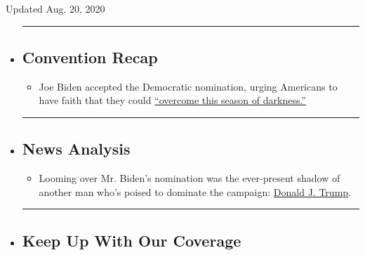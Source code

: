 Updated Aug. 20, 2020

\begin{itemize}
\item
  \begin{center}\rule{0.5\linewidth}{\linethickness}\end{center}

  \hypertarget{convention-recap}{%
  \subsection{Convention Recap}\label{convention-recap}}

  \begin{itemize}
  \tightlist
  \item
    Joe Biden accepted the Democratic nomination, urging Americans to
    have faith that they could
    \href{https://www.nytimes3xbfgragh.onion/2020/08/20/us/politics/Joe-Biden-accepts-democratic-nomination.html?action=click\&pgtype=Article\&state=default\&region=BELOW_MAIN_CONTENT\&context=storylines_guide}{``overcome
    this season of darkness.''}
  \end{itemize}
\item
  \begin{center}\rule{0.5\linewidth}{\linethickness}\end{center}

  \hypertarget{news-analysis}{%
  \subsection{News Analysis}\label{news-analysis}}

  \begin{itemize}
  \tightlist
  \item
    Looming over Mr. Biden's nomination was the ever-present shadow of
    another man who's poised to dominate the campaign:
    \href{https://www.nytimes3xbfgragh.onion/2020/08/20/us/politics/biden-dnc-speech-trump.html?action=click\&pgtype=Article\&state=default\&region=BELOW_MAIN_CONTENT\&context=storylines_guide}{Donald
    J. Trump}.
  \end{itemize}
\item
  \begin{center}\rule{0.5\linewidth}{\linethickness}\end{center}

  \hypertarget{keep-up-with-our-coverage}{%
  \subsection{Keep Up With Our
  Coverage}\label{keep-up-with-our-coverage}}


\end{itemize}
